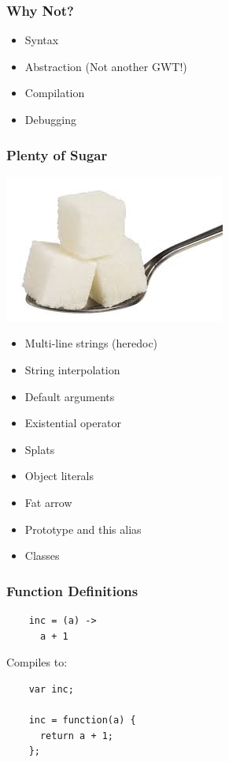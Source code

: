 \documentclass{beamer}
\begin{document}
\begin{frame}
  \frametitle{Why Not?}
  \begin{itemize}
    \pause
    \item Syntax
    \pause
    \item Abstraction (Not another GWT!)
    \pause
    \item Compilation
    \pause
    \item Debugging
      \pause
  \end{itemize}
\end{frame}



\begin{frame}
  \frametitle{Plenty of Sugar}
  \includegraphics[scale=.40]{sugar}
%
%
  \begin{itemize}
    \item Multi-line strings (heredoc)
    \item String interpolation
    \item Default arguments
    \item Existential operator
    \item Splats
    \item Object literals
    \item Fat arrow
    \item Prototype and this alias
    \item Classes
  \end{itemize}
\end{frame}

\begin{frame}[fragile]
  \frametitle{Function Definitions}

  \begin{verbatim}
    inc = (a) ->
      a + 1
  \end{verbatim}

  \pause
  \vspace{.5cm}
  Compiles to:
  \vspace{.5cm}

  \begin{verbatim}
    var inc;

    inc = function(a) {
      return a + 1;
    };    
  \end{verbatim}  
\end{frame}
\end{document}
